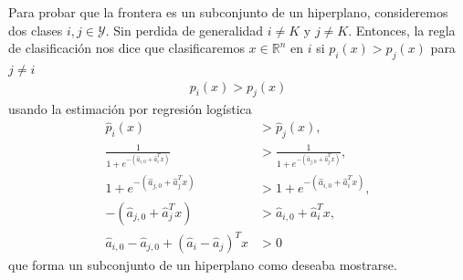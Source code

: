 \documentclass[a4paper, 11pt]{article}
\begin{document}
Para probar que la frontera es un subconjunto de un hiperplano, consideremos dos clases $i,j \in \mathcal{Y } $. Sin perdida de generalidad $i\neq K$ y $j\neq K$. Entonces, la regla de clasificación nos dice que clasificaremos $x\in \mathbb{R}^n $ en $i$ si $p_i(x) > p_j(x)$ para $j\neq i $ 
\begin{align*}
  p_i(x ) > p_j(x )
\end{align*}
usando la estimación por regresión logística
\begin{align*}
  \hat{p}_i (x ) &> \hat{p }_j(x ),\\
  \frac{1}{1+ e^{-(\hat{a}_{i,0} + \hat{a}_i^T x )}} & > \frac{1}{1+ e^{-(\hat{a}_{j,0} + \hat{a}_j^T x )}},\\
  1+ e^{-(\hat{a}_{j,0} + \hat{a}_j^T x )} &> 1+ e^{-(\hat{a}_{i,0} + \hat{a}_i^T x )},\\
  -(\hat{a}_{j,0} + \hat{a}_j^T x ) & > \hat{a}_{i,0} + \hat{a}_i^T x ,\\
  \hat{a }_{i,0} - \hat{a}_{j,0} + (\hat{a}_{i}-\hat{a }_j)^T x &> 0
\end{align*}
que forma un subconjunto de un hiperplano como deseaba mostrarse.
\end{document}
